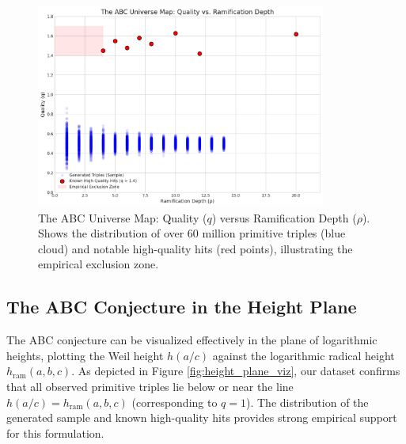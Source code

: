 \documentclass[11pt,a4paper]{article}
\begin{document}
\begin{figure}[h!]
    \centering
    \includegraphics[width=0.85\textwidth]{../figures/quality_vs_rho.png}
    \caption{The ABC Universe Map: Quality ($q$) versus Ramification Depth ($\rho$). Shows the distribution of over 60 million primitive triples (blue cloud) and notable high-quality hits (red points), illustrating the empirical exclusion zone.}
    \label{fig:quality_ramification}
\end{figure}

\subsection{The ABC Conjecture in the Height Plane}
The ABC conjecture can be visualized effectively in the plane of logarithmic heights, plotting the Weil height $h(a/c)$ against the logarithmic radical height $h_{\mathrm{ram}}(a,b,c)$. As depicted in Figure \ref{fig:height_plane_viz}, our dataset confirms that all observed primitive triples lie below or near the line $h(a/c) = h_{\mathrm{ram}}(a,b,c)$ (corresponding to $q=1$). The distribution of the generated sample and known high-quality hits provides strong empirical support for this formulation.
\end{document}
